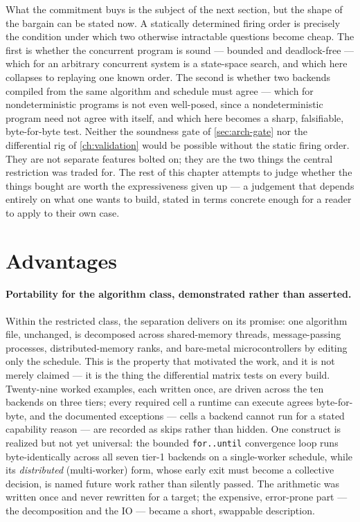 What the commitment buys is the subject of the next section, but the shape of the
bargain can be stated now. A statically determined firing order is precisely the
condition under which two otherwise intractable questions become cheap. The first
is whether the concurrent program is sound --- bounded and deadlock-free --- which
for an arbitrary concurrent system is a state-space search, and which here
collapses to replaying one known order. The second is whether two backends compiled
from the same algorithm and schedule must agree --- which for nondeterministic
programs is not even well-posed, since a nondeterministic program need not agree
with itself, and which here becomes a sharp, falsifiable, byte-for-byte test.
Neither the soundness gate of \cref{sec:arch-gate} nor the differential rig of
\cref{ch:validation} would be possible without the static firing order. They are
not separate features bolted on; they are the two things the central restriction
was traded for. The rest of this chapter attempts to judge whether the things
bought are worth the expressiveness given up --- a judgement that depends entirely
on what one wants to build, stated in terms concrete enough for a reader to apply
to their own case.

\section{Advantages}\label{sec:disc-advantages}

\paragraph{Portability for the algorithm class, demonstrated rather than asserted.}
Within the restricted class, the separation delivers on its promise: one algorithm
file, unchanged, is decomposed across shared-memory threads, message-passing
processes, distributed-memory ranks, and bare-metal microcontrollers by editing
only the schedule. This is the property that motivated the work, and it is not
merely claimed --- it is the thing the differential matrix tests on every build.
Twenty-nine worked examples, each written once, are driven across the ten backends on
three tiers; every required cell a runtime can execute agrees byte-for-byte, and the
documented exceptions --- cells a backend cannot run for a stated capability reason ---
are recorded as skips rather than hidden. One construct is realized but not yet
universal: the bounded \texttt{for..until} convergence loop runs byte-identically across
all seven tier-1 backends on a single-worker schedule, while its \emph{distributed}
(multi-worker) form, whose early exit must become a collective decision, is named future
work rather than silently passed. The arithmetic was written once and
never rewritten for a target; the expensive, error-prone part --- the decomposition
and the IO --- became a short, swappable description.

